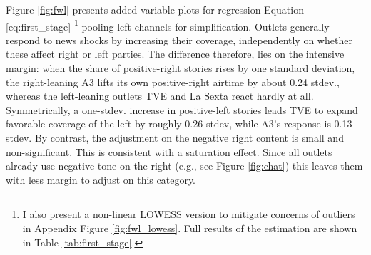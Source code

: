\documentclass[12pt]{article}
\begin{document}
Figure \ref{fig:fwl} presents added-variable plots for regression Equation  \eqref{eq:first_stage} \footnote{I also present a non-linear LOWESS version to mitigate concerns of outliers in Appendix Figure \ref{fig:fwl_lowess}. Full results of the estimation are shown in Table \ref{tab:first_stage}.} pooling left channels for simplification. Outlets generally respond to news shocks by increasing their coverage, independently on whether these affect  right or left parties. The difference therefore, lies on the intensive margin: when the share of  positive-right stories rises by one standard deviation, the right-leaning A3 lifts its own positive-right airtime by about 0.24 stdev., whereas the left-leaning outlets TVE and La Sexta react hardly at all.  Symmetrically, a one-stdev. increase in positive-left stories leads TVE to expand favorable coverage of the left by roughly 0.26 stdev, while A3’s response is 0.13 stdev.  By contrast, the adjustment on the negative right content is small and non-significant. This is consistent with a saturation effect. Since all outlets already use negative tone on the right  (e.g., see Figure \ref{fig:chat}) this leaves them with less margin to adjust on this category. 





 

	
	
\end{document}
